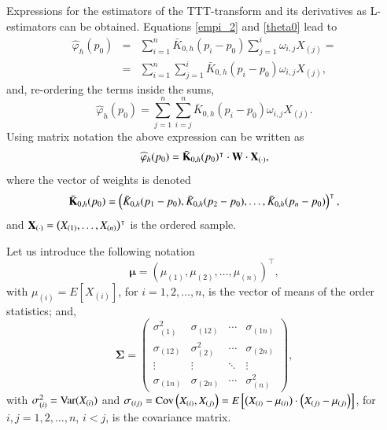 \documentclass[preprint,12pt]{elsarticle}
\begin{document}
Expressions for the estimators of the TTT-transform and its derivatives as L-estimators can be obtained. 
\noindent Equations \eqref{empi_2} and  \eqref{theta0} lead to
\begin{eqnarray*}
\widehat{\varphi}_h(p_0)&=&\sum_{i=1}^n \bar{K}_{0,h}(p_i-p_0)\sum_{j=1}^i\omega_{i,j}X_{(j)}= \\
&=& \sum_{i=1}^n \sum_{j=1}^i \bar{K}_{0,h}(p_i-p_0)\omega_{i,j}X_{(j)}, 
\end{eqnarray*}
and, re-ordering the terms inside the sums, 
\begin{equation}%
\widehat{\varphi}_h(p_0)=  \sum_{j=1}^n \sum_{i=j}^n \bar{K}_{0,h}(p_i-p_0)\omega_{i,j}X_{(j)}. 
\end{equation}
Using matrix notation the above expression can be written as
\begin{equation}\label{L.estim1}
\widehat{\varphi}_h(p_0)=  \bar{\bf K}_{0,h}(p_0)^{\intercal} \cdot {\bf W} \cdot{\bf X}_{(\cdot)}, 
\end{equation}
where the vector of weights is denoted
$$\bar{\bf K}_{0,h}(p_0)=\left(\bar{K}_{0,h}(p_1-p_0), \bar{K}_{0,h}(p_2-p_0),\ldots,\bar{ K}_{0,h}(p_n-p_0)\right)^{\intercal},$$ and ${\bf X}_{(\cdot)}=\left(X_{(1)},\ldots,X_{(n)}\right)^{\intercal}$ is the ordered sample. 
%

\vskip0.3cm

Let us introduce the following notation
\begin{equation}\label{mean}
\boldsymbol{\mu}=\left({\mu}_{(1)},{\mu}_{(2)},\ldots,{\mu}_{(n)}\right)^{\intercal}, 
\end{equation}
with $\mu_{(i)}=E\left[X_{(i)}\right]$, for $i=1,2,\ldots,n$, is the vector of means of the order statistics;  and,  
\begin{equation}\label{var}
{\boldsymbol{\Sigma}}=\left(\begin{array}{cccc}
\sigma_{(1)}^2 & \sigma_{(12)} & \cdots & \sigma_{(1n)} \\
\sigma_{(12)} & \sigma_{(2)}^2 & \cdots & \sigma_{(2n)} \\
\vdots & \vdots & \ddots & \vdots \\
\sigma_{(1n)} & \sigma_{(2n)} & \cdots & \sigma_{(n)}^2
\end{array}\right),
\end{equation}
with $\sigma_{(i)}^2={\rm Var}(X_{(i)})$ and $\sigma_{(ij)}={\rm Cov} \left(X_{(i)},X_{(j)} \right)=E\left[\left(X_{(i)}-\mu_{(i)}\right)\cdot\left(X_{(j)}-\mu_{(j)} \right)\right]$, for $i, j= 1,2,\ldots,n$, $i<j$, is the covariance matrix. 
\end{document}
